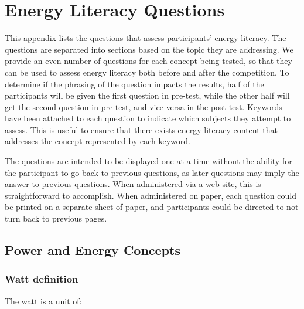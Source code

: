 
\chapter{Energy Literacy Questions}
\label{app:energy-literacy}

This appendix lists the questions that assess participants' energy literacy. The questions are separated into sections based on the topic they are addressing. We provide an even number of questions for each concept being tested, so that they can be used to assess energy literacy both before and after the competition. To determine if the phrasing of the question impacts the results, half of the participants will be given the first question in pre-test, while the other half will get the second question in pre-test, and vice versa in the post test. Keywords have been attached to each question to indicate which subjects they attempt to assess. This is useful to ensure that there exists energy literacy content that addresses the concept represented by each keyword.

The questions are intended to be displayed one at a time without the ability for the participant to go back to previous questions, as later questions may imply the answer to previous questions. When administered via a web site, this is straightforward to accomplish. When administered on paper, each question could be printed on a separate sheet of paper, and participants could be directed to not turn back to previous pages.

\section{Power and Energy Concepts}

\subsection{Watt definition}

\begin{question}
	\item The watt is a unit of:
\end{question}

